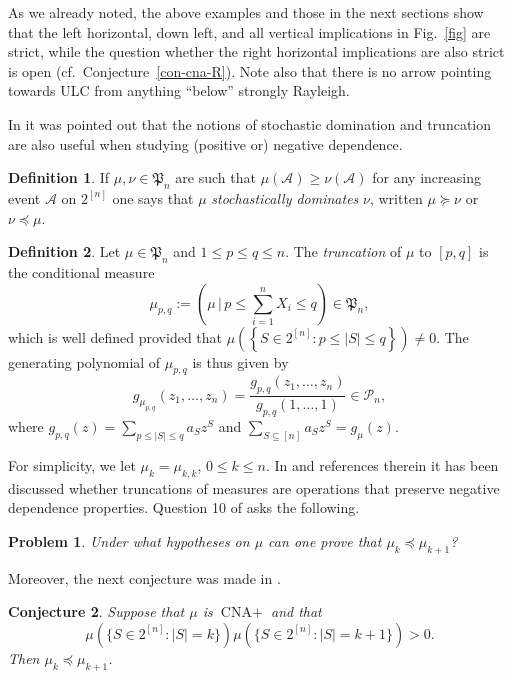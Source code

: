 \documentclass[10pt,reqno]{amsart}
\theoremstyle{plain}
\newtheorem{problem}{Problem}[section]
\newtheorem{conjecture}[problem]{Conjecture}
\theoremstyle{definition}
\newtheorem{definition}{Definition}[section]
\theoremstyle{remark}
\newcommand{\PP}{\mathcal{P}}
\newcommand{\cA}{\mathcal{A}}
\newcommand{\CNA}{\text{CNA}}
\newcommand{\fP}{\mathfrak{P}}
\newcommand{\suc}{\succcurlyeq}
\newcommand{\pc}{\preccurlyeq}
\begin{document}
As we already noted, the above examples and those
in the next sections show that the 
left horizontal, down left, and all vertical implications 
in Fig.~\ref{fig} are strict, while the question whether the right horizontal
implications are also strict is open (cf.~Conjecture~\ref{con-cna-R}). Note
also that there is no arrow pointing towards ULC from anything ``below'' 
strongly Rayleigh.

In \cite[\S I.B \& \S III.C]{P} it was pointed out that the notions of 
stochastic domination and truncation are also 
useful when studying (positive or) negative dependence.

\begin{definition}\label{d-stoc}
If $\mu,\nu\in\fP_n$ are such that $\mu(\cA)\ge \nu(\cA)$ for any
increasing event $\cA$ on $2^{[n]}$ one says that $\mu$ 
{\em stochastically dominates} $\nu$, written $\mu\suc \nu$ or $\nu\pc \mu$.
\end{definition}

\begin{definition}\label{d-trunc}
Let $\mu\in\fP_n$ and $1\le p\le q\le n$. The 
{\em truncation}
of $\mu$ to $[p,q]$ is the conditional measure 
$$\mu_{p,q}:=\left(\mu\,\bigg|\,p\le \sum_{i=1}^{n}X_i\le q\right)
\in\fP_n,$$
which is well defined provided that 
$\mu\left(\left\{S\in 2^{[n]}:p\le |S|\le q\right\}\right)\neq 0$. 
The generating polynomial of $\mu_{p,q}$ is thus given by
$$g_{\mu_{p,q}}(z_1,\ldots,z_n)
=\frac{g_{p,q}(z_1,\ldots,z_n)}
{g_{p,q}(1,\ldots,1)}\in\PP_n,$$
where $g_{p,q}(z)=\sum_{p\le |S|\le q}a_Sz^S$ and 
$\sum_{S\subseteq [n]}a_{S}z^S=g_{\mu}(z)$.
\end{definition}

For simplicity, we let $\mu_k=\mu_{k,k}$, $0\le k\le n$.
In \cite{J-DP,P} and references therein it has been discussed whether 
truncations of measures are operations that preserve negative dependence
properties. Question 10 of \cite{P} asks the following.

\begin{problem}\label{p-stoc-d}
Under what hypotheses on $\mu$ can one prove that $\mu_k\pc \mu_{k+1}$?
\end{problem}

Moreover, the next conjecture was made in \cite[Conjecture 8]{P}.

\begin{conjecture}\label{st}
Suppose that  $\mu$ is $\CNA+$ and that  
$$\mu(\{S \in 2^{[n]} : |S|=k\})\mu(\{S \in 2^{[n]} : |S|=k+1\})>0.$$ 
Then $\mu_k \pc \mu_{k+1}$. 
\end{conjecture}
\end{document}
